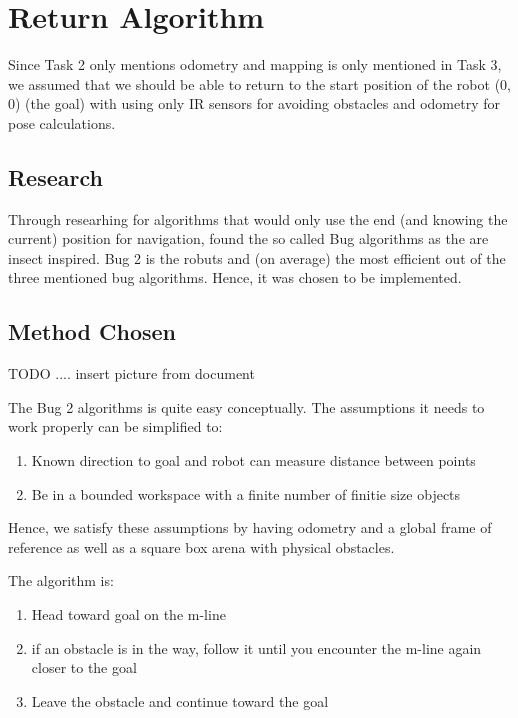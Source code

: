 \documentclass[11pt, a4paper]{article}
\begin{document}
\section{Return Algorithm}
\label{Return Algorithm}

Since Task 2 only mentions odometry and mapping is only mentioned in Task 3, we assumed that we should
be able to return to the start position of the robot ($0$,$0$) (the goal) with using only IR sensors for avoiding obstacles
and odometry for pose calculations. 

\subsection{Research}

Through researhing for algorithms that would only use the end (and knowing the current) position for navigation, 
found the so called Bug algorithms as the are insect inspired. Bug 2 is the robuts and 
(on average) the most efficient out of the three mentioned bug algorithms. 
Hence, it was chosen to be implemented.


\subsection{Method Chosen}

TODO .... insert picture from document


The Bug 2 algorithms is quite easy conceptually. The assumptions it needs to work properly can be simplified to:

\begin{enumerate}

	\item Known direction to goal and robot can measure distance between points
	\item Be in a bounded workspace with a finite number of finitie size objects

\end{enumerate}

Hence, we satisfy these assumptions by having odometry and a global frame of reference as well 
as a square box arena with physical obstacles.

The algorithm is:

\begin{enumerate}

	\item Head toward goal on the m-line
	\item if an obstacle is in the way, follow it until you encounter the m-line again closer to the goal
	\item Leave the obstacle and continue toward the goal

\end{enumerate}
\end{document}
